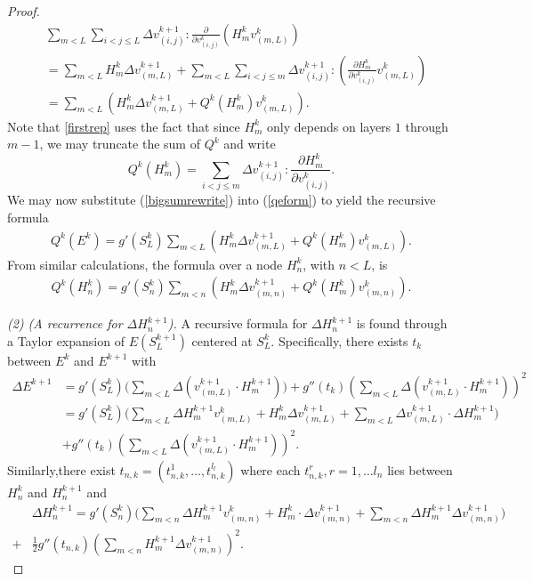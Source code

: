 \documentclass{jcmlatex}
\begin{document}
\begin{proof}
  \begin{align}
 &\sum_{m<L}\sum_{i<j\le L} \Delta v_{(i,j)}^{k+1}:
\frac{\partial }{\partial v_{(i,j)}^k}\left( H_m^{k}v_{(m,L)}^k \right) \label{bigsumrewrite}\\
&= \sum_{m<L}H_m^k\Delta v_{(m,L)}^{k+1}
+\sum_{m<L}\sum_{i<j\le m}\Delta v_{(i,j)}^{k+1}:\left(\frac{\partial H_m^k}{\partial
v_{(i,j)}^k}v_{(m,L)}^k
 \right) \label{firstrep}\\
 &= \sum_{m<L}\left(H_m^k\Delta v_{(m,L)}^{k+1} +Q^k(H^k_m)v^k_{(m,L)}
\right).
\end{align}
Note that \ref{firstrep} uses the fact that since $H_m^k$ only depends on layers $1$ through $m-1$, we may truncate the sum of $Q^k$ and write\begin{equation}
Q^k(H_m^k) =\sum_{i<j\le m}  \Delta v_{(i,j)}^{k+1}:\frac{\partial H_m^k
}{\partial v_{(i,j)}^k}.
\end{equation}
We may now substitute (\ref{bigsumrewrite}) into (\ref{qeform}) to yield the recursive formula
\begin{align}
Q^k(E^k)=  g'\left(S_L^k \right)\sum_{m<L}\left( H_m^k\Delta v_{(m,L)}^{k+1}+Q^k(H^k_m)v^k_{(m,L)}
  \right).
\end{align}
From similar calculations, the formula over a node $H^k_n$, with $n<L$, is
\begin{align}
Q^k(H^k_n)= g'\left(S_n^k\right)\sum_{m<n}\left( H_m^k\Delta v_{(m,n)}^{k+1}+Q^k(H^k_m)v^k_{(m,n)}
  \right).\label{qrec}
\end{align}

\textit{(2) (A recurrence for $\Delta H_n^{k+1}$).} A recursive formula for   $\Delta H^{k+1}_n$ is found through a Taylor expansion of $E(S_L^{k+1})$ centered at $S_L^k$. Specifically, there exists $t_{k}$ between $E^{k}$
and $E^{k+1}$ with
\begin{align}
\Delta E^{k+1} &=  g'\left(S_L^{k} \right)\Big(\sum_{m < L} \Delta( v_{(m,L)}^{k+1}\cdot H_m^{k+1}) \Big)+g''(t_{k})\left(\sum_{m < L}\Delta( v_{(m,L)}^{k+1}\cdot H_m^{k+1})\right)^2\\
 &=  g'\left(S_L^{k} \right)\Big(\sum_{m < L} \Delta H_m^{k+1}
v_{(m,L)}^k +H^k_m\Delta v_{(m,L)}^{k+1}
+\sum_{m < L}\Delta v_{(m,L)}^{k+1}\cdot \Delta H_m^{k+1} \Big)
\\&+g''(t_{k})\left(\sum_{m < L}\Delta( v_{(m,L)}^{k+1}\cdot H_m^{k+1})\right)^2.
\end{align}
Similarly,there exist $t_{n,k} = (t_{n,k}^{1}, \dots, t_{n,k}^{l_l})$ where each
$t_{n,k}^r, r = 1, \dots l_n$ lies between $H_n^k$ and $H_n^{k+1}$ and
\begin{align}
&\Delta H_n^{k+1} = g'\left(S_n^k \right)\Big(\sum_{m < n}\Delta H_m^{k+1}v_{(m,n)}^k
 +H^k_m\cdot\Delta v_{(m,n)}^{k+1}
+\sum_{m < n}\Delta H_m^{k+1}\Delta v_{(m,n)}^{k+1}  \Big)
\\+&\frac 12g''(t_{n,k})\left(\sum_{m < n}H_m^{k+1}\Delta v_{(m,n)}^{k+1}
\right)^2\label{diffrec}.
\end{align}



\end{proof}
\end{document}
